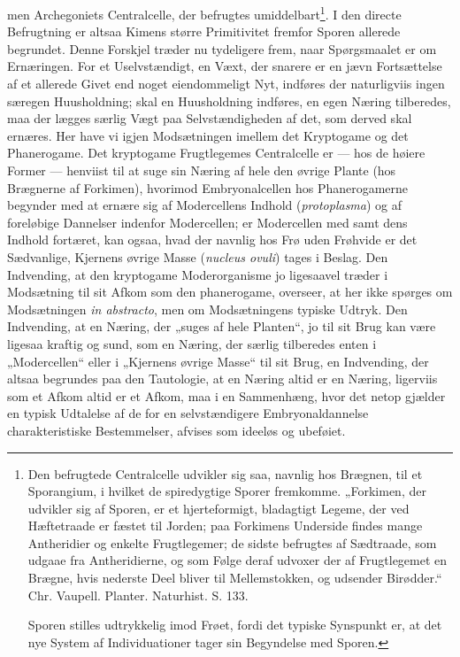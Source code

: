 \documentclass[12pt,a4paper]{book}
\begin{document}
men Archegoniets
\setcounter{footnote}{0}
Centralcelle, der befrugtes umiddelbart\footnote{Den befrugtede
Centralcelle udvikler sig saa, navnlig hos Brægnen, til et Sporangium, i
hvilket de spiredygtige Sporer fremkomme. „Forkimen, der udvikler sig af
Sporen, er et hjerteformigt, bladagtigt Legeme, der ved Hæftetraade er
fæstet til Jorden; paa Forkimens Underside findes mange Antheridier og
enkelte Frugtlegemer; de sidste befrugtes af Sædtraade, som udgaae fra
Antheridierne, og som Følge deraf udvoxer der af Frugtlegemet en Brægne,
hvis nederste Deel bliver til Mellemstokken, og udsender Birødder.“
Chr. Vaupell. Planter. Naturhist. S. 133.

Sporen stilles udtrykkelig imod Frøet, fordi det typiske Synspunkt er,
at det nye System af Individuationer tager sin Begyndelse med Sporen.}.
I den directe Befrugtning er altsaa Kimens større Primitivitet fremfor
Sporen allerede begrundet. Denne Forskjel træder nu tydeligere frem,
naar Spørgsmaalet er om Ernæringen. For et Uselvstændigt, en Væxt, der
snarere er en jævn Fortsættelse af et allerede Givet end noget
eiendommeligt Nyt, indføres der naturligviis ingen særegen Huusholdning;
skal en Huusholdning
indføres, en egen Næring tilberedes, maa der lægges særlig Vægt paa
Selvstændigheden af det, som derved skal ernæres. Her have vi igjen
Modsætningen imellem det Kryptogame og det Phanerogame. Det kryptogame
Frugtlegemes Centralcelle er --- hos de høiere Former --- henviist til
at suge sin Næring af hele den øvrige Plante (hos Brægnerne af
Forkimen), hvorimod Embryonalcellen hos Phanerogamerne begynder med at
ernære sig af Modercellens Indhold (\textit{protoplasma}) og af
foreløbige Dannelser indenfor Modercellen; er Modercellen med samt dens
Indhold fortæret, kan ogsaa, hvad der navnlig hos Frø uden Frøhvide er
det Sædvanlige, Kjernens øvrige Masse (\textit{nucleus ovuli}) tages i
Beslag. Den Indvending, at den kryptogame Moderorganisme jo ligesaavel
træder i Modsætning til sit Afkom som den phanerogame, overseer, at her
ikke spørges om Modsætningen \textit{in abstracto}, men om
Modsætningens typiske Udtryk. Den Indvending, at en Næring, der „suges
af hele Planten“, jo til sit Brug kan være ligesaa kraftig og sund, som
en Næring, der særlig tilberedes enten i „Modercellen“ eller i „Kjernens
øvrige Masse“ til sit Brug, en Indvending, der altsaa begrundes paa den
Tautologie, at en Næring altid er en Næring, ligerviis som et Afkom
altid er et Afkom, maa i en Sammenhæng, hvor det netop gjælder en typisk
Udtalelse af de for en selvstændigere Embryonaldannelse charakteristiske
Bestemmelser, afvises som ideeløs og ubeføiet.
\end{document}
